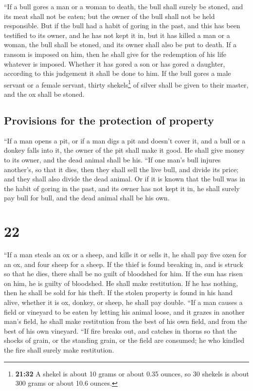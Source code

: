  ``If a bull gores a man or a woman to death, the bull
shall surely be stoned, and its meat shall not be eaten; but the owner
of the bull shall not be held responsible.  But if the
bull had a habit of goring in the past, and this has been testified to
its owner, and he has not kept it in, but it has killed a man or a
woman, the bull shall be stoned, and its owner shall also be put to
death.  If a ransom is imposed on him, then he shall give
for the redemption of his life whatever is imposed. 
Whether it has gored a son or has gored a daughter, according to this
judgement it shall be done to him.  If the bull gores a
male servant or a female servant, thirty shekels\footnote{\textbf{21:32}
  A shekel is about 10 grams or about 0.35 ounces, so 30 shekels is
  about 300 grams or about 10.6 ounces.} of silver shall be given to
their master, and the ox shall be stoned.

\hypertarget{provisions-for-the-protection-of-property}{%
\subsection{Provisions for the protection of
property}\label{provisions-for-the-protection-of-property}}

 ``If a man opens a pit, or if a man digs a pit and
doesn't cover it, and a bull or a donkey falls into it, 
the owner of the pit shall make it good. He shall give money to its
owner, and the dead animal shall be his.  ``If one man's
bull injures another's, so that it dies, then they shall sell the live
bull, and divide its price; and they shall also divide the dead animal.
 Or if it is known that the bull was in the habit of
goring in the past, and its owner has not kept it in, he shall surely
pay bull for bull, and the dead animal shall be his own.

\hypertarget{section-21}{%
\section{22}\label{section-21}}

 ``If a man steals an ox or a sheep, and kills it or sells
it, he shall pay five oxen for an ox, and four sheep for a sheep.
 If the thief is found breaking in, and is struck so that
he dies, there shall be no guilt of bloodshed for him.  If
the sun has risen on him, he is guilty of bloodshed. He shall make
restitution. If he has nothing, then he shall be sold for his theft.
 If the stolen property is found in his hand alive,
whether it is ox, donkey, or sheep, he shall pay double. 
``If a man causes a field or vineyard to be eaten by letting his animal
loose, and it grazes in another man's field, he shall make restitution
from the best of his own field, and from the best of his own vineyard.
 ``If fire breaks out, and catches in thorns so that the
shocks of grain, or the standing grain, or the field are consumed; he
who kindled the fire shall surely make restitution.

